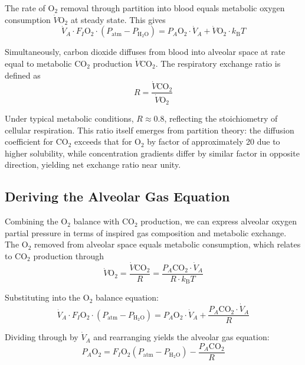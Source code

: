 \documentclass[12pt,a4paper]{article}
\theoremstyle{remark}
\newcommand{\kB}{k_{\mathrm{B}}}
\begin{document}
The rate of O$_{2}$ removal through partition into blood equals metabolic oxygen consumption $\dot{V}\mathrm{O}_{2}$ at steady state. This gives
\begin{equation}
\dot{V}_{A} \cdot F_{I}\mathrm{O}_{2} \cdot (P_{\mathrm{atm}} - P_{\mathrm{H}_{2}\mathrm{O}}) = P_{A}\mathrm{O}_{2} \cdot \dot{V}_{A} + \dot{V}\mathrm{O}_{2} \cdot \kB T
\end{equation}

Simultaneously, carbon dioxide diffuses from blood into alveolar space at rate equal to metabolic CO$_{2}$ production $\dot{V}\mathrm{CO}_{2}$. The respiratory exchange ratio is defined as
\begin{equation}
R = \frac{\dot{V}\mathrm{CO}_{2}}{\dot{V}\mathrm{O}_{2}}
\end{equation}

Under typical metabolic conditions, $R \approx 0.8$, reflecting the stoichiometry of cellular respiration. This ratio itself emerges from partition theory: the diffusion coefficient for CO$_{2}$ exceeds that for O$_{2}$ by factor of approximately 20 due to higher solubility, while concentration gradients differ by similar factor in opposite direction, yielding net exchange ratio near unity.

\subsection{Deriving the Alveolar Gas Equation}

Combining the O$_{2}$ balance with CO$_{2}$ production, we can express alveolar oxygen partial pressure in terms of inspired gas composition and metabolic exchange. The O$_{2}$ removed from alveolar space equals metabolic consumption, which relates to CO$_{2}$ production through
\begin{equation}
\dot{V}\mathrm{O}_{2} = \frac{\dot{V}\mathrm{CO}_{2}}{R} = \frac{P_{A}\mathrm{CO}_{2} \cdot \dot{V}_{A}}{R \cdot \kB T}
\end{equation}

Substituting into the O$_{2}$ balance equation:
\begin{equation}
\dot{V}_{A} \cdot F_{I}\mathrm{O}_{2} \cdot (P_{\mathrm{atm}} - P_{\mathrm{H}_{2}\mathrm{O}}) = P_{A}\mathrm{O}_{2} \cdot \dot{V}_{A} + \frac{P_{A}\mathrm{CO}_{2} \cdot \dot{V}_{A}}{R}
\end{equation}

Dividing through by $\dot{V}_{A}$ and rearranging yields the alveolar gas equation:
\begin{equation}
\boxed{P_{A}\mathrm{O}_{2} = F_{I}\mathrm{O}_{2}(P_{\mathrm{atm}} - P_{\mathrm{H}_{2}\mathrm{O}}) - \frac{P_{A}\mathrm{CO}_{2}}{R}}
\label{eq:alveolar_gas}
\end{equation}
\end{document}
